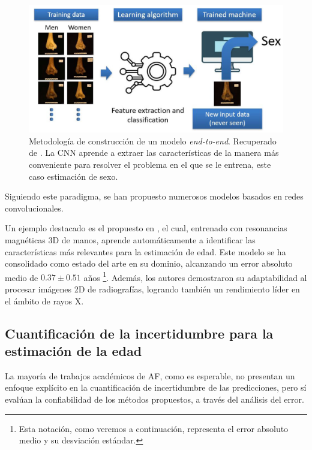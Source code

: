 \begin{figure}[h]
    \centering
    \includegraphics[width=\textwidth]{capitulos/cap_03/imagenes/end-to-end_learning.png}
    \caption[
        Metodología de construcción de un modelo \textit{end-to-end}. 
        Recuperado de \cite{venema2022}.
    ]{
        Metodología de construcción de un modelo \textit{end-to-end}. 
        Recuperado de \cite{venema2022}.
        La CNN aprende a extraer las características de la manera más conveniente para resolver el 
        problema en el que se le entrena, este caso estimación de sexo.
    }
    \label{fig:end-to-end_model}
\end{figure}

Siguiendo este paradigma, se han propuesto numerosos modelos basados en redes convolucionales.

Un ejemplo destacado es el propuesto en \cite{stern2019}, el cual, entrenado con resonancias magnéticas 3D de 
manos, aprende automáticamente a identificar las características más relevantes para la estimación de edad. 
Este modelo se ha consolidado como estado del arte en su dominio, alcanzando un error absoluto medio de 
$0.37 \pm 0.51$ años
\footnote{
    Esta notación, como veremos a continuación, representa el error absoluto medio y su desviación estándar.
}. 
Además, los autores demostraron su adaptabilidad al procesar imágenes 2D de radiografías, logrando también un 
rendimiento líder en el ámbito de rayos X.


\subsection{Cuantificación de la incertidumbre para la estimación de la edad}

La mayoría de trabajos académicos de AF, como es esperable, no presentan un enfoque explícito en la 
cuantificación de incertidumbre de las predicciones, pero sí evalúan la confiabilidad de los métodos 
propuestos, a través del análisis del error. 

